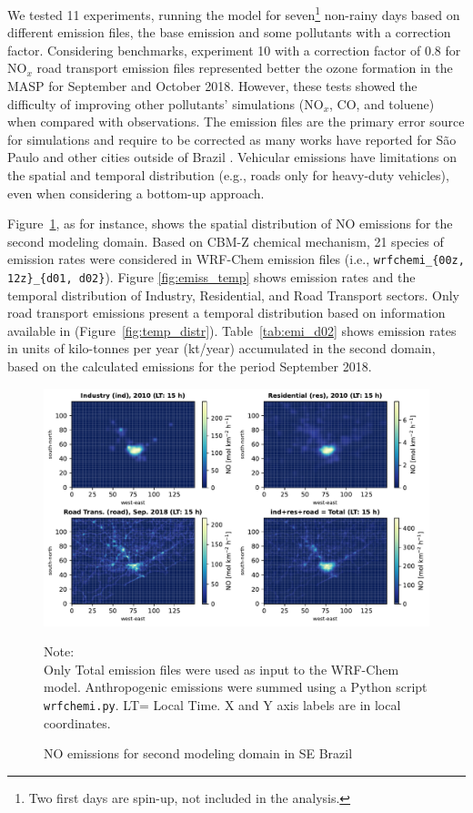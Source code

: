    We tested 11 experiments, running the model for seven\footnote{Two first days are spin-up, not included in the analysis.} non-rainy days based on different emission files, the base emission and some pollutants with a correction factor.
   Considering \citet{Emery2017} benchmarks, experiment 10 with a correction factor of 0.8 for NO$_x$ road transport emission files represented better the ozone formation in the MASP for September and October 2018.
   However, these tests showed the difficulty of improving other pollutants' simulations (NO$_x$, CO, and toluene) when compared with observations. 
   The emission files are the primary error source for simulations and require to be corrected as many works have reported for São Paulo and other cities outside of Brazil \citep{Russell2000, Holnicki2015, Andrade2017, Ibarra2020}.
   Vehicular emissions \citep[described in][]{Andrade2015} have limitations on the spatial and temporal distribution (e.g., roads only for heavy-duty vehicles), even when considering a bottom-up approach.
   
	Figure~\ref{fig:anth_dist}, as for instance, shows the spatial distribution of NO emissions for the second modeling domain.
	Based on CBM-Z chemical mechanism, 21  species of emission rates were considered in WRF-Chem emission files (i.e., \verb|wrfchemi_{00z, 12z}_{d01, d02}|).
	Figure \ref{fig:emiss_temp} shows emission rates and the temporal distribution of Industry, Residential, and Road Transport sectors. 
	Only road transport emissions present a temporal distribution based on information available in \citet{Andrade2015} (Figure~\ref{fig:temp_distr}).
	Table~\ref{tab:emi_d02} shows emission rates in units of kilo-tonnes per year (kt/year) accumulated in the second domain, based on the calculated emissions for the period September 2018.
	
	\begin{figure}[htb]
		\begin{center}
			\includegraphics[width=.9\textwidth]{fig/E_NO_emi_d02.pdf}
		\end{center}
  		\caption{NO emissions for second modeling domain in SE Brazil}
  		{\scriptsize Note:\\ Only Total emission files were used as input to the WRF-Chem model. Anthropogenic emissions were summed using a Python script \verb|wrfchemi.py|. LT= Local Time. X and Y axis labels are in  local coordinates.}
  		\label{fig:anth_dist}
	\end{figure}
	
